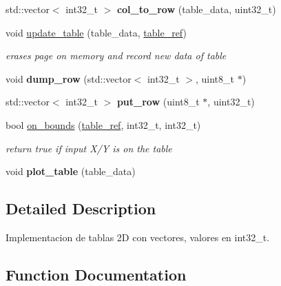 \begin{DoxyCompactItemize}
std\+::vector$<$ int32\+\_\+t $>$ {\bfseries col\+\_\+to\+\_\+row} (table\+\_\+data, uint32\+\_\+t)
\item 
\mbox{\label{namespacetables_a609889745ffc450440eee727f8d28034}} 
void \hyperlink{namespacetables_a609889745ffc450440eee727f8d28034}{update\+\_\+table} (table\+\_\+data, \hyperlink{structtable__ref}{table\+\_\+ref})
\begin{DoxyCompactList}\small\item\em erases page on memory and record new data of table \end{DoxyCompactList}\item 
\mbox{\label{namespacetables_a3d4eae2328222f2672364baad17b14eb}} 
void {\bfseries dump\+\_\+row} (std\+::vector$<$ int32\+\_\+t $>$, uint8\+\_\+t $\ast$)
\item 
\mbox{\label{namespacetables_aacb653c68579815b85eca89c831e9300}} 
std\+::vector$<$ int32\+\_\+t $>$ {\bfseries put\+\_\+row} (uint8\+\_\+t $\ast$, uint32\+\_\+t)
\item 
\mbox{\label{namespacetables_a5df27daa6f33383e90a21d0ea12f6d9f}} 
bool \hyperlink{namespacetables_a5df27daa6f33383e90a21d0ea12f6d9f}{on\+\_\+bounds} (\hyperlink{structtable__ref}{table\+\_\+ref}, int32\+\_\+t, int32\+\_\+t)
\begin{DoxyCompactList}\small\item\em return true if input X/Y is on the table \end{DoxyCompactList}\item 
\mbox{\label{namespacetables_acfce212d9f061ab7df55e665ab89932b}} 
void {\bfseries plot\+\_\+table} (table\+\_\+data)
\end{DoxyCompactItemize}


\subsection{Detailed Description}
Implementacion de tablas 2D con vectores, valores en int32\+\_\+t. 

\subsection{Function Documentation}
\mbox{\label{namespacetables_a27170b1a1036e75516b990dc97ea5835}} 
